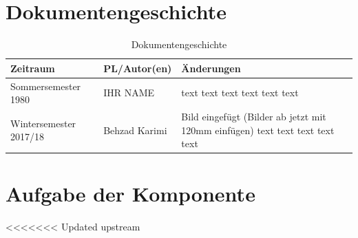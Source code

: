 \section{Dokumentengeschichte}
\begin{table}[h]
 \begin{tabular}{|l|l|p{4cm}|}
 \hline
 Zeitraum & PL/Autor(en) & Änderungen \\
 \hline
 Sommersemester 1980 & IHR NAME & 
text \newline 
text \newline 
text \newline 
text \newline 
text \newline 
text \newline 
 
  \\
 \hline
 Wintersemester 2017/18 & Behzad Karimi & 
Bild eingefügt (Bilder ab jetzt mit 120mm einfügen) \newline 
text \newline 
text \newline 
text \newline 
text \newline 
text \newline 
 
  \\
 \hline
 \end{tabular}
 \caption{Dokumentengeschichte}
 \end{table}

\section{Aufgabe der Komponente}
<<<<<<< Updated upstream



